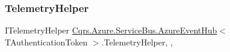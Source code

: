 \subsubsection{\texorpdfstring{Telemetry\+Helper}{TelemetryHelper}}
{\footnotesize\ttfamily I\+Telemetry\+Helper \hyperlink{classCqrs_1_1Azure_1_1ServiceBus_1_1AzureEventHub}{Cqrs.\+Azure.\+Service\+Bus.\+Azure\+Event\+Hub}$<$ T\+Authentication\+Token $>$.Telemetry\+Helper\hspace{0.3cm}{\ttfamily [get]}, {\ttfamily [set]}, {\ttfamily [protected]}}

